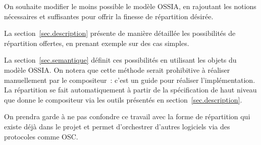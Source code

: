 \documentclass[10pt]{article}
\newcommand\ossia{OSSIA\xspace}
\begin{document}
On souhaite modifier le moins possible le modèle \ossia, 
en rajoutant les notions nécessaires et suffisantes pour offrir la finesse de répartition désirée.

La section~\ref{sec.description} présente de manière détaillée les possibilités 
de répartition offertes, en prenant exemple sur des cas simples.

La section~\ref{sec.semantique} définit ces possibilités en utilisant les objets du modèle \ossia. 
On notera que cette méthode serait prohibitive à réaliser manuellement par le compositeur~: c'est un guide pour réaliser l'implémentation. 
La répartition se fait automatiquement à partir de la spécification de haut niveau que donne le compositeur via les outils présentés en section~\ref{sec.description}. 

On prendra garde à ne pas confondre ce travail avec la forme de répartition qui existe déjà dans le projet et permet d'orchestrer d'autres logiciels via des protocoles comme OSC.








\end{document}
